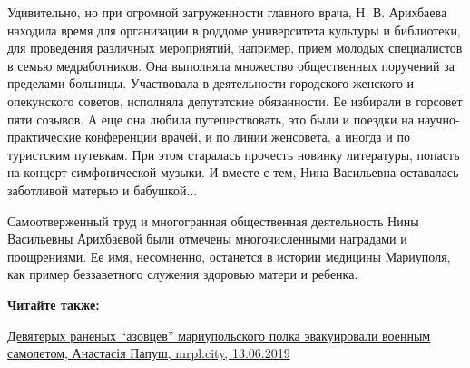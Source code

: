 Удивительно, но при огромной загруженности главного врача, Н. В. Арихбаева
находила время для организации в роддоме университета культуры и библиотеки,
для проведения различных мероприятий, например, прием молодых специалистов в
семью медработников. Она выполняла множество общественных поручений за
пределами больницы. Участвовала в деятельности городского женского и
опекунского советов, исполняла депутатские обязанности. Ее избирали в горсовет
пяти созывов. А еще она любила путешествовать, это были и поездки на
научно-практические конференции врачей, и по линии женсовета, а иногда и по
туристским путевкам. При этом старалась прочесть новинку литературы, попасть на
концерт симфонической музыки. И вместе с тем, Нина Васильевна оставалась
заботливой матерью и бабушкой...

Самоотверженный труд и многогранная общественная деятельность Нины Васильевны
Арихбаевой были отмечены многочисленными наградами и поощрениями. Ее имя,
несомненно, останется в истории медицины Мариуполя, как пример беззаветного
служения здоровью матери и ребенка.

\textbf{Читайте также:} 

\href{https://mrpl.city/news/view/devyateryh-ranenyh-azovtsev-mariupolskogo-polka-e-vakuirovali-voennym-samoletom-foto-plusvideo}{%
Девятерых раненых \enquote{азовцев} мариупольского полка эвакуировали военным самолетом, Анастасія Папуш, mrpl.city, 13.06.2019}
